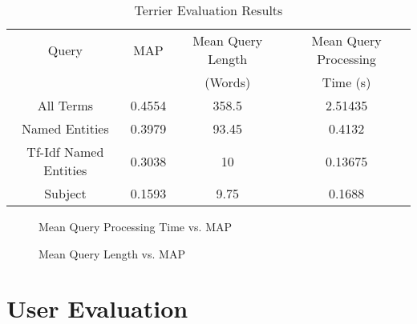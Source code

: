 \documentclass{l4proj}
\begin{document}
\begin{center}
\begin{table}[h]
\centering
\begin{tabular}{|c|c|c|c|}
\hline
Query                 & MAP    & Mean Query Length & Mean Query Processing \\ 
& & (Words) & Time (s) \\\hline
All Terms             & 0.4554 & 358.5             & 2.51435                        \\ \hline
Named Entities        & 0.3979 & 93.45             & 0.4132                         \\ \hline
Tf-Idf Named Entities & 0.3038 & 10                & 0.13675                       \\ \hline
Subject               & 0.1593 & 9.75              & 0.1688                        \\ \hline
\end{tabular}
\caption{Terrier Evaluation Results}
\label{results}
\end{table}
\end{center}
\begin{figure}[h]
\caption{Mean Query Processing Time vs. MAP} \label{fig: timegraph}
\end{figure}
\bigskip
\begin{figure}[h!]
\caption{Mean Query Length vs. MAP} \label{fig: lengthgraph}
\end{figure}










\section{User Evaluation}
\end{document}
